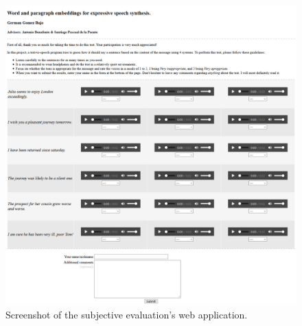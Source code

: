 \begin{figure}
    \centering
    \includegraphics[width=16cm]{figures/webapp}
    \caption{Screenshot of the subjective evaluation's web application.}
\end{figure}

